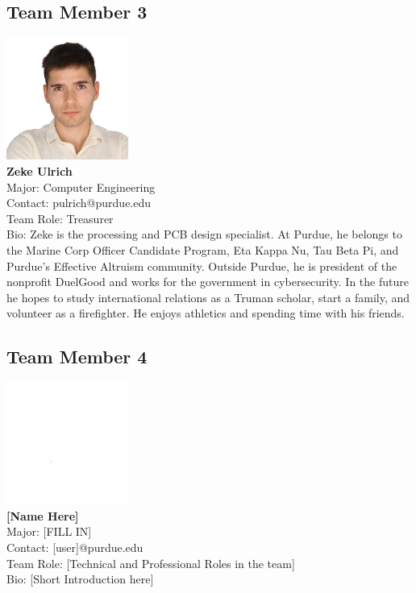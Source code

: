 \subsection{Team Member 3}
\includegraphics[height=4cm]{images/zeke.png} \\
\textbf{Zeke Ulrich}\\
Major: Computer Engineering\\
Contact: pulrich@purdue.edu\\
Team Role: Treasurer \\
Bio: Zeke is the processing and PCB design specialist.
At Purdue, he belongs to the Marine Corp Officer Candidate Program,
Eta Kappa Nu, Tau Beta Pi, and Purdue's Effective Altruism community.
Outside Purdue, he is president of the nonprofit DuelGood and works
for the government in cybersecurity.
In the future he hopes to study international relations as a Truman
scholar, start a family, and volunteer as a firefighter.
He enjoys athletics and spending time with his friends.

\subsection{Team Member 4}
\includegraphics[height=4cm]{images/white.png} \\
\textbf{[Name Here]}\\
Major: [FILL IN]\\
Contact: [user]@purdue.edu\\
Team Role: [Technical and Professional Roles in the team] \\
Bio: [Short Introduction here]